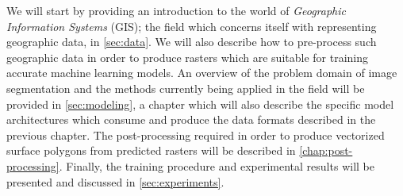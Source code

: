 We will start by providing an introduction to the world of \textit{Geographic Information Systems} (GIS); the field which concerns itself with representing geographic data, in \cref{sec:data}.
We will also describe how to pre-process such geographic data in order to produce rasters which are suitable for training accurate machine learning models.
An overview of the problem domain of image segmentation and the methods currently being applied in the field will be provided in \cref{sec:modeling}, a chapter which will also describe the specific model architectures which consume and produce the data formats described in the previous chapter.
The post-processing required in order to produce vectorized surface polygons from predicted rasters will be described in \cref{chap:post-processing}.
Finally, the training procedure and experimental results will be presented and discussed in \cref{sec:experiments}.
